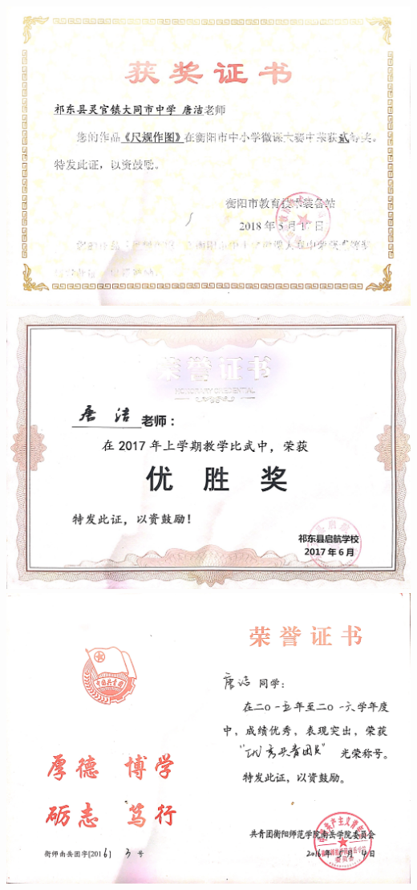\documentclass[UFT8]{ctexart}%
\begin{document}
\begin{center}
 \includegraphics[scale=0.25]{figs/2018-05.jpg }
 \includegraphics[scale=0.27]{figs/2017-06.jpg }
 \includegraphics[scale=0.1]{figs/2016-05.jpg }

\end{center}
\end{document}
